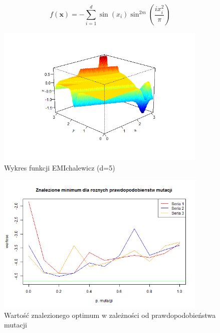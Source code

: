 \documentclass[11pt, a4paper]{article}
\begin{document}
\begin{equation}\label{eq:emichalewicz}
f(\boldsymbol{x}) = - \sum_{i=1}^{d} \sin(x_i) \sin^{2m} (\frac{i x_i^2}{\pi})
\end{equation}

\newpage
\begin{figure}[H]
	\begin{center}
		\includegraphics[width=0.9\textwidth]{./assets/EMichalewicz1.png} %
		\caption{Wykres funkcji EMIchalewicz (d=5)}
		\label{fig:emichalewicz1}
	\end{center}
\end{figure}

\begin{figure}[H]
	\begin{center}
		\includegraphics[width=0.9\textwidth]{./assets/EMichalewicz2.png} %
		\caption{Wartość znalezionego optimum w zależności od prawdopodobieństwa mutacji}
		\label{fig:emichalewicz2}
	\end{center}
\end{figure}
\end{document}
